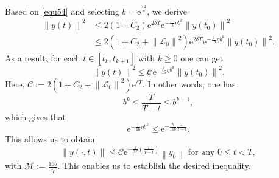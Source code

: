 \documentclass[sn-mathphys]{sn-jnl}
\begin{document}
Based on \eqref{equ54} and selecting $b = \mathrm{e}^{ \frac{32}{\eta}}$, we derive
\begin{align*}
    \left\|y\left(t\right)\right\|^{2} &\leq 2 \left(1+C_2 \right)\mathrm{e}^{2\delta T}\mathrm{e}^{-\frac{1}{16}\eta b^{k}} \left\|y\left(t_{0}\right)\right\|^{2}\\
    &\leq 2 \left(1+C_2+\left\| \mathcal{L}_{0} \right\|^{2} \right)\mathrm{e}^{2\delta T} \mathrm{e}^{-\frac{1}{16}\eta b^{ k}} \left\|y\left(t_{0}\right)\right\|^{2}.
\end{align*}
As a result, for each $t \in \left[t_{k},t_{k+1} \right]$ with $k \geq 0$ one can get
\begin{equation}
    \left\|y\left(t\right)\right\|^{2}
     \leq \mathcal{C} \mathrm{e}^{-\frac{1}{16}\eta b^{k}} \left\|y\left(t_{0}\right)\right\|^{2}.
\end{equation}
Here, $\mathcal{C}:= 2 \left(1+C_2+\left\| \mathcal{L}_{0} \right\|^{2} \right)\mathrm{e}^{\delta T}$. In other words, one has
\begin{equation*}
    b^{k} \leq \frac{T}{T-t} \leq b^{k+1},
\end{equation*}
which gives that
\begin{equation*}
     \mathrm{e}^{-\frac{1}{16}\eta b^{ k}} \leq \mathrm{e}^{-\frac{\eta}{16 b}\frac{T}{T-t} }.
\end{equation*}
This allows us to obtain
\begin{equation*}
\|y(\cdot,t)\| \leq \mathcal{C} \mathrm{e}^{-\frac{1}{\mathcal{M}}\left(\frac{T}{T-t}\right)} \left\|y_{0}\right\| \text { for any } 0 \leq t<T,
\end{equation*}
with $\mathcal{M} := \frac{16 b}{\eta} $. 
This enables us to establish the desired inequality.
\end{document}
